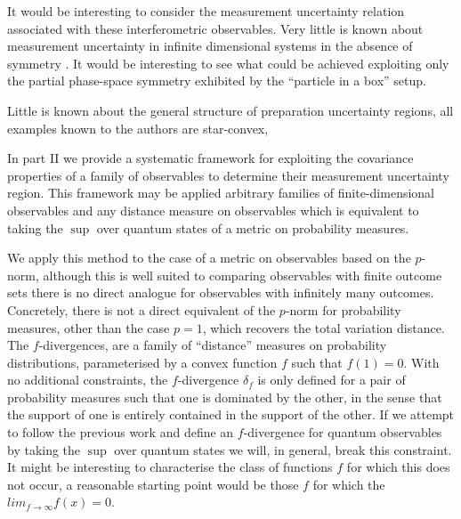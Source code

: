 It would be interesting to consider the measurement uncertainty relation associated with these interferometric observables. Very little is known about measurement uncertainty in infinite dimensional systems in the absence of  symmetry . It would be interesting to see what could be achieved exploiting only the partial phase-space symmetry exhibited by the ``particle in a box'' setup.

Little is known about the general structure of preparation uncertainty regions, all examples known to the authors are star-convex, 


In part II we provide a systematic framework for exploiting the covariance properties of a family of observables to determine their measurement uncertainty region. This framework may be applied arbitrary families of finite-dimensional observables and any distance measure on observables which is equivalent to taking the $\sup$ over quantum states of a metric on probability measures. 

We apply this method to the case of a metric on observables based on the $p$-norm, although this is well suited to comparing observables with finite outcome sets there is no direct analogue for observables with infinitely many outcomes. Concretely, there is not a direct equivalent of the $p$-norm for probability measures, other than the case $p=1$, which recovers the total variation distance. The $f$-divergences,  are a family of ``distance'' measures on probability distributions, parameterised by a convex function $f$ such that $f(1) = 0$. With no additional constraints, the $f$-divergence $\delta_f$ is only defined for a pair of probability measures such that one is dominated by the other, in the sense that the support of one is entirely contained in the support of the other. If we attempt to follow the previous work and define an $f$-divergence for quantum observables by taking the $\sup$ over quantum states we will, in general, break this constraint. It might be interesting to characterise the class of functions $f$ for which this does not occur, a reasonable starting point would be those $f$ for which the $lim_{f\to\infty}f(x) = 0$.


